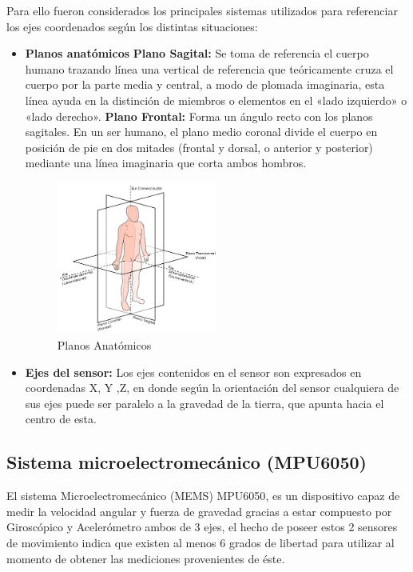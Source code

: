 \documentclass[12pt,a4paper]{article}
\begin{document}
Para ello fueron considerados los principales sistemas utilizados para referenciar los ejes coordenados según los distintas situaciones:
\begin{itemize}
	
	\item \textbf{Planos anatómicos} 
		\subitem \textbf{Plano Sagital:}
		 Se toma de referencia el cuerpo humano trazando línea una  vertical de referencia que teóricamente cruza el cuerpo por la parte media y central, a modo de plomada imaginaria, esta línea ayuda en la distinción de miembros o elementos en el «lado izquierdo» o «lado derecho».
		 \subitem \textbf{Plano Frontal:} Forma un ángulo recto con los planos sagitales. En un ser humano, el plano medio coronal divide el cuerpo en posición de pie en dos mitades (frontal y dorsal, o anterior y posterior) mediante una línea imaginaria que corta ambos hombros.

	\begin{figure}[H]
		\centering
		\includegraphics[width=0.5\textwidth]{images/planosAnatomicos}
		\caption{Planos Anatómicos}
		\label{fig:sagital}
	\end{figure}

	\item \textbf{Ejes del sensor:} Los ejes contenidos en el sensor son expresados en coordenadas X, Y ,Z, en donde según la orientación del sensor cualquiera de sus ejes puede ser paralelo a la gravedad de la tierra, que apunta hacia el centro de esta.
\end{itemize}

\subsection{Sistema microelectromecánico (MPU6050)}
El sistema Microelectromecánico (MEMS) MPU6050\cite{MPU6050}, es un dispositivo capaz de medir la velocidad angular y fuerza de gravedad gracias a estar compuesto por Giroscópico y Acelerómetro ambos de 3 ejes, el hecho de poseer estos 2 sensores de movimiento indica que existen al menos 6 grados de libertad para utilizar al momento de obtener las mediciones provenientes de éste.
\end{document}
